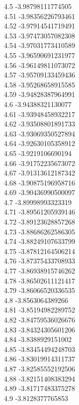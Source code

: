 {4.5	-3.98798111774505\\
4.51	-3.98356226793461\\
4.52	-3.97914541719491\\
4.53	-3.97473057082308\\
4.54	-3.97031773410589\\
4.55	-3.96590691231977\\
4.56	-3.96149811073072\\
4.57	-3.95709133459436\\
4.58	-3.95268658915585\\
4.59	-3.94828387964991\\
4.6	-3.94388321130077\\
4.61	-3.93948458932217\\
4.62	-3.93508801891733\\
4.63	-3.93069350527894\\
4.64	-3.92630105358912\\
4.65	-3.9219106690194\\
4.66	-3.91752235673072\\
4.67	-3.91313612187342\\
4.68	-3.90875196958716\\
4.69	-3.90436990500097\\
4.7	-3.89998993323319\\
4.71	-3.89561205939146\\
4.72	-3.89123628857268\\
4.73	-3.88686262586305\\
4.74	-3.88249107633799\\
4.75	-3.87812164506214\\
4.76	-3.87375433708933\\
4.77	-3.86938915746262\\
4.78	-3.86502611121417\\
4.79	-3.86066520336535\\
4.8	-3.8563064389266\\
4.81	-3.85194982289752\\
4.82	-3.84759536026676\\
4.83	-3.84324305601206\\
4.84	-3.8388929151002\\
4.85	-3.83454494248703\\
4.86	-3.83019914311737\\
4.87	-3.82585552192506\\
4.88	-3.82151408383294\\
4.89	-3.81717483375278\\
4.9	-3.8128377765853\\
}
